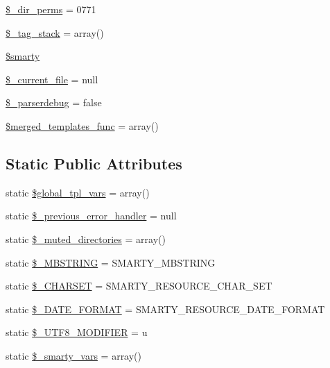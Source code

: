 \begin{DoxyCompactItemize}
\item 
\hyperlink{class_smarty_a917cec287e9c00b1c188e4a815b279b2}{\$\+\_\+dir\+\_\+perms} = 0771
\item 
\hyperlink{class_smarty_a8bc334635a0aa8e117a5e822ca71ee67}{\$\+\_\+tag\+\_\+stack} = array()
\item 
\hyperlink{class_smarty_ac3ae29e9ccbb2006fa26fd9eb2c12117}{\$smarty}
\item 
\hyperlink{class_smarty_a4c6ef40a0c9534d4c25ec77cd4e8d388}{\$\+\_\+current\+\_\+file} = null
\item 
\hyperlink{class_smarty_acb80fdbc8948da9101789788487b83ac}{\$\+\_\+parserdebug} = false
\item 
\hyperlink{class_smarty_aaec0e99c242be08eb8f87cbd498700c9}{\$merged\+\_\+templates\+\_\+func} = array()
\end{DoxyCompactItemize}
\subsection*{Static Public Attributes}
\begin{DoxyCompactItemize}
\item 
static \hyperlink{class_smarty_a53565c9ede228644fe99fae6296cf693}{\$global\+\_\+tpl\+\_\+vars} = array()
\item 
static \hyperlink{class_smarty_a249a4c3134b46c30b8e3f4f2d097e862}{\$\+\_\+previous\+\_\+error\+\_\+handler} = null
\item 
static \hyperlink{class_smarty_abb10f08cd280a1b7e1b2e6cb6afc460c}{\$\+\_\+muted\+\_\+directories} = array()
\item 
static \hyperlink{class_smarty_a5a41ec0fc4477ef639ba3cf063816114}{\$\+\_\+\+M\+B\+S\+T\+R\+I\+N\+G} = S\+M\+A\+R\+T\+Y\+\_\+\+M\+B\+S\+T\+R\+I\+N\+G
\item 
static \hyperlink{class_smarty_ae5404cebc4fdd786067002ed91be9d7b}{\$\+\_\+\+C\+H\+A\+R\+S\+E\+T} = S\+M\+A\+R\+T\+Y\+\_\+\+R\+E\+S\+O\+U\+R\+C\+E\+\_\+\+C\+H\+A\+R\+\_\+\+S\+E\+T
\item 
static \hyperlink{class_smarty_a10771c318c1ae4d6178476dbf20dbdda}{\$\+\_\+\+D\+A\+T\+E\+\_\+\+F\+O\+R\+M\+A\+T} = S\+M\+A\+R\+T\+Y\+\_\+\+R\+E\+S\+O\+U\+R\+C\+E\+\_\+\+D\+A\+T\+E\+\_\+\+F\+O\+R\+M\+A\+T
\item 
static \hyperlink{class_smarty_a504a79926c6aa6aae2f238d2e74ce84b}{\$\+\_\+\+U\+T\+F8\+\_\+\+M\+O\+D\+I\+F\+I\+E\+R} = \textquotesingle{}u\textquotesingle{}
\item 
static \hyperlink{class_smarty_a8b74cd5266386c9651f86d02b4bf3bc4}{\$\+\_\+smarty\+\_\+vars} = array()
\end{DoxyCompactItemize}


